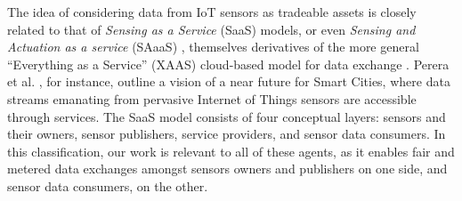 \documentclass[chi_draft]{sigchi}
\begin{document}


The idea of considering data from IoT sensors as tradeable assets is closely related to that of \textit{Sensing as a Service} (SaaS) models, or even \textit{Sensing and Actuation as a service} (SAaaS) \cite{distefano2012sensing}, themselves derivatives of the more general ``Everything as a Service'' (XAAS) cloud-based model for data exchange \cite{5719575}. Perera et al. \cite{Perera2014}, for instance, outline a vision of a near future for Smart Cities, where data streams emanating from pervasive Internet of Things sensors are accessible through services. The SaaS model consists of four conceptual layers: sensors and their owners, sensor publishers, service providers, and sensor data consumers. In this classification, our work is relevant to all of these agents, as it enables fair and metered data exchanges amongst sensors owners and publishers on one side, and sensor data consumers, on the other.





%
\end{document}
